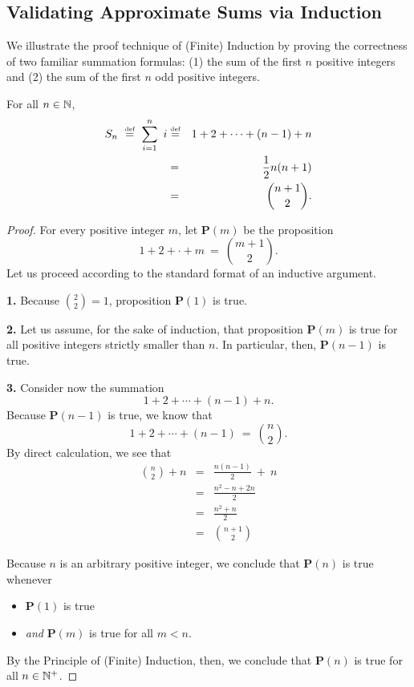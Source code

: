 \subsection{Validating Approximate Sums via Induction}
\label{sec:Sums-Induction}


We illustrate the proof technique of (Finite) Induction by proving the
correctness of two familiar summation formulas: (1) the sum of the
first $n$ positive integers and (2) the sum of the first $n$ odd
positive integers.


\begin{center}
\label{thm:sum-1-to-n-induction}
For all $n \in \mathbb{N}$,
\begin{eqnarray}
\nonumber
S_n \ \stackrel{\mbox{{\tiny def}}}{=} \ \sum_{i=1}^n \ i
 & \stackrel{\mbox{{\tiny def}}}{=} &
 1 + 2 + \cdots + (n-1) + n \\
\label{eq:sum-first-n}
 & = & {1 \over 2} n (n+1) \\
\nonumber
 & = & {{n+1}  \choose 2}.
\end{eqnarray}
\end{center}

\begin{proof}
For every positive integer $m$, let {\bf P}$(m)$ be the proposition
\[  1 + 2 + \cdot + m \ = \ {{m+1} \choose 2}. \]
Let us proceed according to the standard format of an inductive
argument.

{\bf 1.} Because ${\displaystyle {2 \choose 2}} = 1$, proposition {\bf
  P}$(1)$ is true.

{\bf 2.} Let us assume, for the sake of induction, that proposition
{\bf P}$(m)$ is true for all positive integers strictly smaller than
$n$.  In particular, then, {\bf P}$(n-1)$ is true.

{\bf 3.} Consider now the summation
\[ 1 + 2 + \cdots + (n-1) + n. \]
Because {\bf P}$(n-1)$ is true, we know that
\[ 1 + 2 + \cdots + (n-1) \ = \ {n \choose 2}.  \]
By direct calculation, we see that
\begin{eqnarray*}
{n \choose 2} + n
  & = & \frac{n(n-1)}{2}  \ + \ n \\ 
  & = & \frac{n^2 - n + 2n}{2} \\
  & = & \frac{n^2 + n}{2} \\
  & = & {{n+1} \choose 2}
\end{eqnarray*}

Because $n$ is an arbitrary positive integer, we conclude that
{\bf P}$(n)$ is true whenever
\begin{itemize}
\item
{\bf P}$(1)$ is true
\item
{\em and}
{\bf P}$(m)$ is true for all $m < n$.
\end{itemize}
By the Principle of (Finite) Induction, then, we conclude that {\bf
  P}$(n)$ is true for all $n \in \mathbb{N}^+$.

\end{proof}

